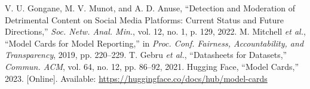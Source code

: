 \documentclass[11pt]{article}
\begin{document}

\begin{thebibliography}{00}
 V. U. Gongane, M. V. Munot, and A. D. Anuse, ``Detection and Moderation of Detrimental Content on Social Media Platforms: Current Status and Future Directions,'' \emph{Soc. Netw. Anal. Min.}, vol. 12, no. 1, p. 129, 2022.
 M. Mitchell \emph{et al.}, ``Model Cards for Model Reporting,'' in \emph{Proc. Conf. Fairness, Accountability, and Transparency}, 2019, pp. 220--229.
 T. Gebru \emph{et al.}, ``Datasheets for Datasets,'' \emph{Commun. ACM}, vol. 64, no. 12, pp. 86--92, 2021.
 Hugging Face, ``Model Cards,'' 2023. [Online]. Available: \url{https://huggingface.co/docs/hub/model-cards}
\end{thebibliography}
\end{document}

